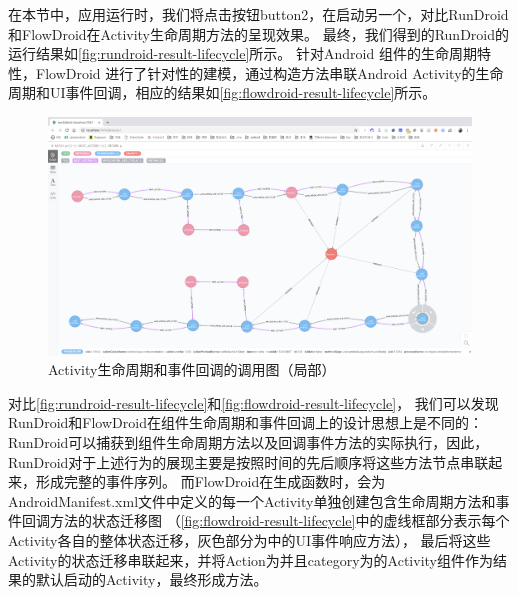 在本节中，应用运行时，我们将点击按钮button2，在启动另一个，对比RunDroid和FlowDroid在Activity生命周期方法的呈现效果。
最终，我们得到的RunDroid的运行结果如\autoref{fig:rundroid-result-lifecycle}所示。
针对Android 组件的生命周期特性，FlowDroid 进行了针对性的建模，通过构造方法串联Android Activity的生命周期和UI事件回调，相应的结果如\autoref{fig:flowdroid-result-lifecycle}所示。

\begin{figure}[ht]
	\centering
	\includegraphics[width=\textwidth]{./Figures/android-lifecycle-rundroid.png}
	\caption{Activity生命周期和事件回调的调用图（局部）}
	\label{fig:rundroid-result-lifecycle}
\end{figure}

对比\autoref{fig:rundroid-result-lifecycle}和\autoref{fig:flowdroid-result-lifecycle}，
我们可以发现RunDroid和FlowDroid在组件生命周期和事件回调上的设计思想上是不同的：
RunDroid可以捕获到组件生命周期方法以及回调事件方法的实际执行，因此，RunDroid对于上述行为的展现主要是按照时间的先后顺序将这些方法节点串联起来，形成完整的事件序列。
而FlowDroid在生成函数时，会为AndroidManifest.xml文件中定义的每一个Activity单独创建包含生命周期方法和事件回调方法的状态迁移图
（\autoref{fig:flowdroid-result-lifecycle}中的虚线框部分表示每个Activity各自的整体状态迁移，灰色部分为中的UI事件响应方法），
最后将这些Activity的状态迁移串联起来，并将Action为并且category为的Activity组件作为结果的默认启动的Activity，最终形成方法。


